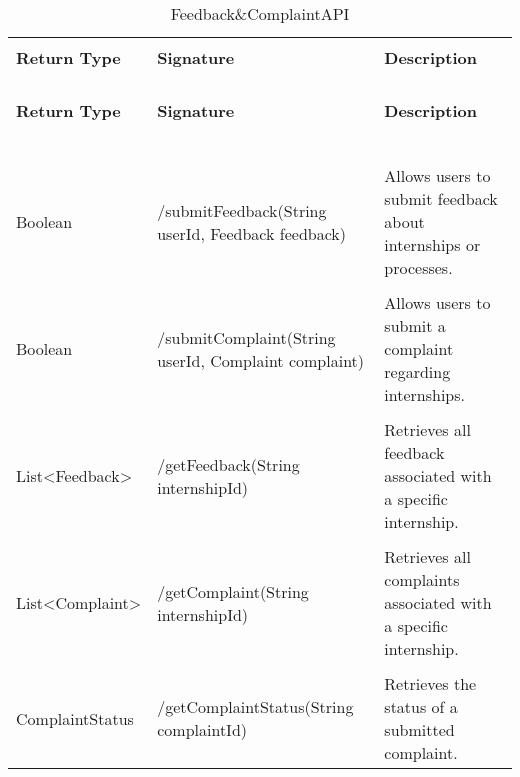 \begin{longtable}{p{}p{}p{}}
    \caption{Feedback\&ComplaintAPI}
    \vspace{0.5em}\\
    \hline
    \vspace{0.5em}\\
    \textbf{Return Type} & \textbf{Signature} & \textbf{Description} \\
    \vspace{0.5em}\\
    \hline
    \vspace{0.5em}\\
    \endfirsthead
    \vspace{0.5em}\\
    \hline
    \vspace{0.5em}\\
    \textbf{Return Type} & \textbf{Signature} & \textbf{Description} \\
    \vspace{0.5em}\\
    \hline
    \vspace{0.5em}\\
    \endhead
    
    \vspace{0.5em}\\
    \hline
    \vspace{0.5em}\\
    \endfoot
    
    \vspace{0.5em}\\
    \hline
    \vspace{0.5em}\\
    \endlastfoot
    
    Boolean &
    /submitFeedback(String userId, Feedback feedback) &
    Allows users to submit feedback about internships or processes. \\
    \vspace{0.5em}\\
    Boolean &
    /submitComplaint(String userId, Complaint complaint) &
    Allows users to submit a complaint regarding internships. \\
    \vspace{0.5em}\\
    List<Feedback> &
    /getFeedback(String internshipId) &
    Retrieves all feedback associated with a specific internship. \\
    \vspace{0.5em}\\
    List<Complaint> &
    /getComplaint(String internshipId) &
    Retrieves all complaints associated with a specific internship. \\
    \vspace{0.5em}\\
    ComplaintStatus &
    /getComplaintStatus(String complaintId) &
    Retrieves the status of a submitted complaint. \\

\end{longtable}

